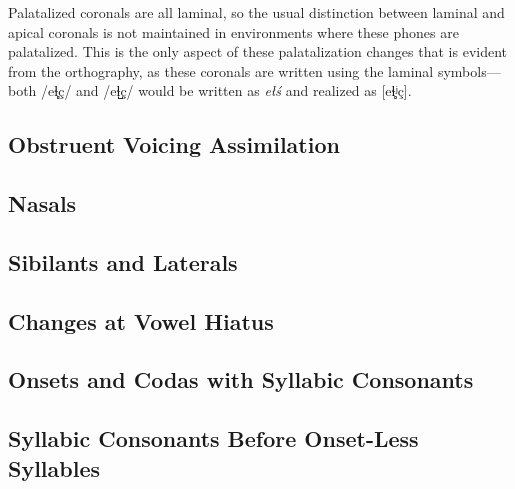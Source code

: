 \documentclass[a4paper,11pt,oneside,openany]{memoir}
\newcommand{\bripa}[1]{[#1]}
\newcommand{\phipa}[1]{/#1/}
\newcommand{\latfric}{ɬ}
\newcommand{\pal}{ʲ}
\newcommand{\lamino}{̻}
\newcommand{\apico}{̺}
\begin{document}
\begin{center}
\end{center}
\noindent Palatalized coronals are all laminal, so the usual distinction between laminal and apical coronals is not maintained in environments where these phones are palatalized. This is the only aspect of these palatalization changes that is evident from the orthography, as these coronals are written using the laminal symbols---both \phipa{e\latfric\lamino ç} and \phipa{e\latfric\apico ç} would be written as \textit{e\l\'s} and realized as \bripa{e\latfric\lamino\pal ç}.

\subsection{Obstruent Voicing Assimilation}

\subsection{Nasals}

\subsection{Sibilants and Laterals}

\subsection{Changes at Vowel Hiatus}

\subsection{Onsets and Codas with Syllabic Consonants}

\subsection{Syllabic Consonants Before Onset-Less Syllables}
\end{document}
